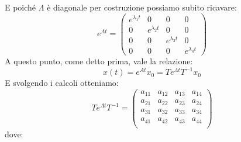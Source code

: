 E poiché $\Lambda$ è diagonale per costruzione possiamo subito ricavare:
\begin{displaymath}
e^{\Lambda t}=\left(\begin{array}{cccc}
e^{\lambda_{1}t} & 0 & 0 & 0\\
0 & e^{\lambda_{2}t} & 0 & 0\\
0 & 0 & e^{\lambda_{3}t} & 0\\
0 & 0 & 0 & e^{\lambda_{4}t}
\end{array}\right)
\end{displaymath}
A questo punto, come detto prima, vale la relazione:
\begin{displaymath}
x(t)=e^{At}x_{0}=Te^{\Lambda t}T^{-1}x_{0}
\end{displaymath}
E svolgendo i calcoli otteniamo:
\begin{displaymath}
Te^{\Lambda t}T^{-1}=\left(\begin{array}{cccc}
a_{11} & a_{12} & a_{13} & a_{14}\\
a_{21} & a_{22} & a_{23} & a_{24}\\
a_{31} & a_{32} & a_{33} & a_{34}\\
a_{41} & a_{42} & a_{43} & a_{44}\\
\end{array}\right)
\end{displaymath}
dove:
